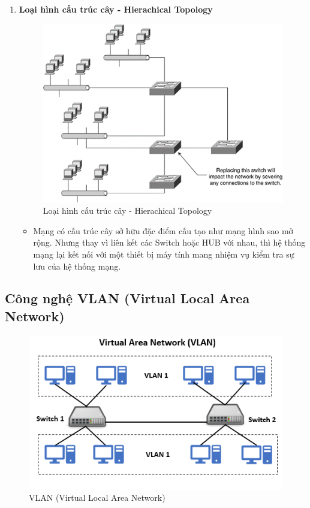 \documentclass[13pt]{article}
\begin{document}
\begin{enumerate}
    \newpage
    \item \textbf{Loại hình cấu trúc cây - Hierachical Topology}
    \begin{figure}[h!]
        \centering
        \includegraphics[width=0.7\linewidth]{image/10.png}
            \caption{Loại hình cấu trúc cây - Hierachical Topology}
            \label{fig:label1}
    \end{figure}
    
    \begin{itemize}
        \item Mạng có cấu trúc cây sở hữu đặc điểm cấu tạo như mạng hình sao mở rộng. Nhưng thay vì liên kết các Switch hoặc HUB với nhau, thì hệ thống mạng lại kết nối với một thiết bị máy tính mang nhiệm vụ kiểm tra sự lưu của hệ thống mạng.
    \end{itemize}
\end{enumerate}
\subsection{Công nghệ VLAN (Virtual Local Area Network)}
    \begin{figure}[h!]
        \centering
        \includegraphics[width=0.7\linewidth]{image/12.png}
            \caption{VLAN (Virtual Local Area Network)}
            \label{fig:label1}
    \end{figure}
    
\end{document}
